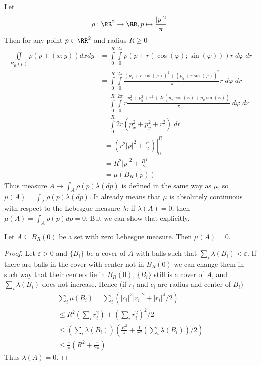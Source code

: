 \documentclass[12pt,a4paper]{article}
\begin{document}
    \begin{enumproblem}
        Let
        \[\rho: \RR^2 \to \RR, p \mapsto \frac{|p|^2}{\pi}.\]
        Then for any point $p \in \RR^2$ and radius $R \geqslant 0$
        \begin{align*}
            \iint\limits_{B_R(p)} \rho(p + (x; y)) dx dy
            &= \int\limits_0^R \int\limits_0^{2\pi} \rho(p + r(\cos(\varphi); \sin(\varphi))) r\; d\varphi\; dr\\
            &= \int\limits_0^R \int\limits_0^{2\pi} \frac{(p_x + r \cos(\varphi))^2 + (p_y + r \sin(\varphi))^2}{\pi} r\; d\varphi\; dr\\
            &= \int\limits_0^R \int\limits_0^{2\pi} r \frac{p_x^2 + p_y^2 + r^2 + 2r(p_x \cos(\varphi) + p_y \sin(\varphi))}{\pi}\; d\varphi\; dr\\
            &= \int\limits_0^R 2r (p_x^2 + p_y^2 + r^2)\; dr
        \end{align*}
        \begin{align*}
            &= \left.\left(r^2 |p|^2 + \frac{r^4}{2}\right)\right|_0^R\\
            &= R^2 |p|^2 + \frac{R^4}{2}\\
            &= \mu(B_R(p))
        \end{align*}
        Thus measure $A \mapsto \int_A \rho(p) \lambda(dp)$ is defined in the same way as $\mu$, so $\mu(A) = \int_A \rho(p) \lambda(dp)$. It already means that $\mu$ is absolutely continuous with respect to the Lebesgue measure $\lambda$: if $\lambda(A) = 0$, then $\mu(A) = \int_A \rho(p) dp = 0$. But we can show that explicitly.

        \begin{lemma}
            Let $A \subseteq B_R(0)$ be a set with zero Lebesgue measure. Then $\mu(A) = 0$.
        \end{lemma}

        \begin{proof}
            Let $\varepsilon > 0$ and $\{B_i\}$ be a cover of $A$ with balls such that $\sum_i \lambda(B_i) < \varepsilon$. If there are balls in the cover with center not in $B_R(0)$ we can change them in such way that their centers lie in $B_R(0)$, $\{B_i\}$ still is a cover of $A$, and $\sum_i \lambda(B_i)$ does not increase. Hence (if $r_i$ and $c_i$ are radius and center of $B_i$)
            \begin{multline*}
                \sum_i \mu(B_i) = \sum_i (|c_i|^2 |r_i|^2 + |r_i|^4/2)\\
                \leqslant R^2\left(\sum_i r_i^2\right) + \left(\sum_i r_i^2\right)^2/2\\
                \leqslant \left(\sum_i \lambda(B_i)\right)\left(\frac{R^2}{\pi} + \frac{1}{\pi^2}\left(\sum_i \lambda(B_i)\right)/2\right)\\
                \leqslant \frac{\varepsilon}{\pi} (R^2 + \frac{\varepsilon}{2 \pi}).
            \end{multline*}
            Thus $\lambda(A) = 0$.
        \end{proof}


\end{enumproblem}
\end{document}
